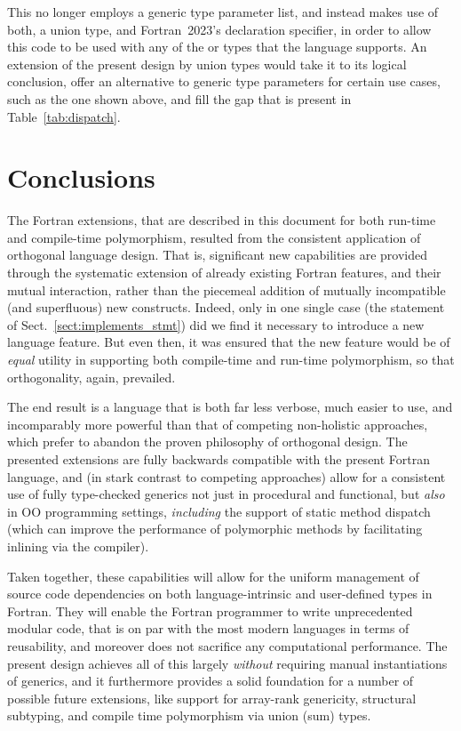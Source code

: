 \documentclass[11pt,oneside]{report}
\newcommand{\code}[1]{{\selectfont\ttfamily{#1}}}
\begin{document}
This no longer employs a generic type parameter list, and instead
makes use of both, a union type, and Fortran~2023's \code{typeof}
declaration specifier, in order to allow this code to be used
with any of the \code{integer} or \code{real} types that the language
supports. An extension of the present design by union types would take
it to its logical conclusion, offer an alternative to generic type
parameters for certain use cases, such as the one shown above, and fill
the gap that is present in Table~\ref{tab:dispatch}.

\section{Conclusions}

The Fortran extensions, that are described in this document for both
run-time and compile-time polymorphism, resulted from the consistent
application of orthogonal language design. That is, significant new
capabilities are provided through the systematic extension of already
existing Fortran features, and their mutual interaction, rather than
the piecemeal addition of mutually incompatible (and superfluous) new
constructs. Indeed, only in one single case (the \code{implements}
statement of Sect.~\ref{sect:implements_stmt}) did we find it
necessary to introduce a new language feature. But even then, it was
ensured that the new feature would be of \emph{equal} utility in
supporting both compile-time and run-time polymorphism, so that
orthogonality, again, prevailed.

The end result is a language that is both far less verbose, much
easier to use, and incomparably more powerful than that of competing
non-holistic approaches, which prefer to abandon the proven philosophy
of orthogonal design. The presented extensions are fully backwards
compatible with the present Fortran language, and (in stark contrast
to competing approaches) allow for a consistent use of fully
type-checked generics not just in procedural and functional, but
\emph{also} in OO programming settings, \emph{including} the support
of static method dispatch (which can improve the performance of
polymorphic methods by facilitating inlining via the compiler).

Taken together, these capabilities will allow for the uniform
management of source code dependencies on both language-intrinsic and
user-defined types in Fortran. They will enable the Fortran programmer
to write unprecedented modular code, that is on par with the most
modern languages in terms of reusability, and moreover does not
sacrifice any computational performance. The present design achieves
all of this largely \emph{without} requiring manual instantiations of
generics, and it furthermore provides a solid foundation for a number
of possible future extensions, like support for array-rank genericity,
structural subtyping, and compile time polymorphism via union (sum)
types.
\end{document}
